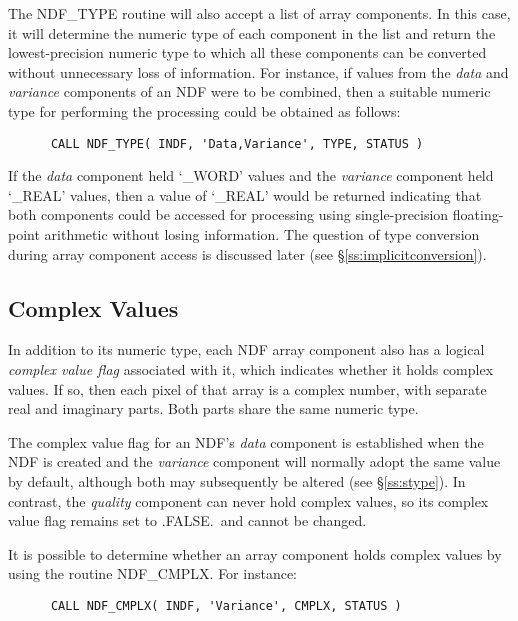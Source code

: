 \documentclass[twoside,11pt]{article}
\newcommand{\htmlref}[2]{#1}
\newcommand{\xlabel}[1]{}
\newcommand{\st}[1]{{\em{#1}}}
\begin{document}
The NDF\_TYPE routine will also accept a list of array components.
In this case, it will determine the numeric type of each component in the
list and return the lowest-precision numeric type to which all these
components can be converted without unnecessary loss of information. 
For instance, if values from the \st{data\/} and \st{variance\/} components of
an NDF were to be combined, then a suitable numeric type for performing the
processing could be obtained as follows: 

\small
\begin{verbatim}
      CALL NDF_TYPE( INDF, 'Data,Variance', TYPE, STATUS )
\end{verbatim}
\normalsize

If the \st{data\/} component held `\_WORD' values and the \st{variance\/}
component held `\_REAL' values, then a value of `\_REAL' would be returned
indicating that both components could be accessed for processing using
single-precision floating-point arithmetic without losing information. 
The question of type conversion during array component access is discussed
later (see \S\ref{ss:implicitconversion}).

\subsection{\xlabel{complex_values}Complex Values}

In addition to its numeric type, each NDF array component also has a logical
\st{complex value flag\/} associated with it, which indicates whether it
holds complex values. 
If so, then each pixel of that array is a complex number, with separate real
and imaginary parts. 
Both parts share the same numeric type.

The complex value flag for an NDF's \st{data\/} component is established when the
NDF is created and the \st{variance\/} component will normally adopt the same
value by default, although both may subsequently be altered (see
\S\ref{ss:stype}).
In contrast, the \st{quality\/} component can never hold complex values, so its 
complex value flag remains set to .FALSE.\ and cannot be changed.

It is possible to determine whether an array component holds complex values 
by using the routine \htmlref{NDF\_CMPLX}{NDF_CMPLX}.
For instance:

\small
\begin{verbatim}
      CALL NDF_CMPLX( INDF, 'Variance', CMPLX, STATUS )
\end{verbatim}
\normalsize
\end{document}
